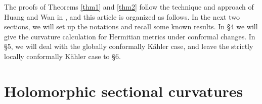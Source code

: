 \documentclass{amsart}
\numberwithin{equation}{section}
\begin{document}
The proofs of Theorems \ref{thm1} and \ref{thm2} follow the technique and approach of Huang and Wan in \cite{HW}, and this article is organized as follows. In the next two sections, we will set up the notations and recall some known results. In \S 4 we will give the curvature calculation for Hermitian metrics under conformal changes. In \S 5, we will deal with the globally conformally K\"ahler case, and leave the strictly  locally conformally K\"ahler case to \S 6.





\vspace{0.3cm}

\section{Holomorphic sectional curvatures}
\end{document}

